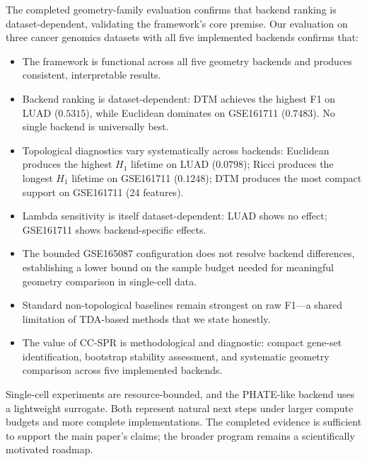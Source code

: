 \documentclass[11pt]{article}
\begin{document}
The completed geometry-family evaluation confirms that backend ranking is dataset-dependent, validating the framework's core premise.
Our evaluation on three cancer genomics datasets with all five implemented backends confirms that:
\begin{itemize}[leftmargin=1.5em]
\item The framework is functional across all five geometry backends and produces consistent, interpretable results.
\item Backend ranking is dataset-dependent: DTM achieves the highest F1 on LUAD ($0.5315$), while Euclidean dominates on GSE161711 ($0.7483$).
No single backend is universally best.
\item Topological diagnostics vary systematically across backends: Euclidean produces the highest $H_1$ lifetime on LUAD ($0.0798$); Ricci produces the longest $H_1$ lifetime on GSE161711 ($0.1248$); DTM produces the most compact support on GSE161711 (24 features).
\item Lambda sensitivity is itself dataset-dependent: LUAD shows no effect; GSE161711 shows backend-specific effects.
\item The bounded GSE165087 configuration does not resolve backend differences, establishing a lower bound on the sample budget needed for meaningful geometry comparison in single-cell data.
\item Standard non-topological baselines remain strongest on raw F1---a shared limitation of TDA-based methods that we state honestly.
\item The value of CC-SPR is methodological and diagnostic: compact gene-set identification, bootstrap stability assessment, and systematic geometry comparison across five implemented backends.
\end{itemize}

Single-cell experiments are resource-bounded, and the PHATE-like backend uses a lightweight surrogate.
Both represent natural next steps under larger compute budgets and more complete implementations.
The completed evidence is sufficient to support the main paper's claims; the broader program remains a scientifically motivated roadmap.
\end{document}
